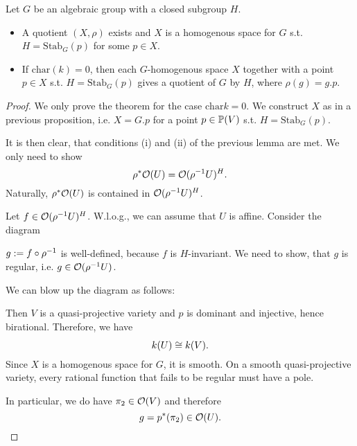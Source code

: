 \begin{theorem}
	Let $G$ be an algebraic group with a closed subgroup $H$.
	\begin{itemize}
		\item A quotient $(X, \rho)$ exists and $X$ is a homogenous space for $G$ s.t. $H = \mathrm{Stab}_G(p)$ for some $p \in X$.
		\item If $\mathrm{char}(k)= 0$, then each $G$-homogenous space $X$ together with a point $p\in X$ s.t. $H = \mathrm{Stab}_G(p)$ gives a quotient of $G$ by $H$, where $\rho(g) = g.p$.
	\end{itemize}
\end{theorem}
\begin{proof}
	We only prove the theorem for the case $\mathrm{char} k = 0$. We construct $X$ as in a previous proposition, i.e. $X = G.p$ for a point $p \in \P(V)$ s.t. $H = \mathrm{Stab}_G(p)$.
	
	It is then clear, that conditions (i) and (ii) of the previous lemma are met. We only need to show
	\[ \rho^*\O(U) = \O(\rho\i U)^H. \]
	Naturally, $\rho^*\O(U)$ is contained in $\O(\rho\i U)^H$.
	
	Let $f \in \O(\rho\i U)^H$. W.l.o.g., we can assume that $U$ is affine. Consider the diagram
	\begin{center}
	\end{center}
$g := f \circ \rho\i$ is well-defined, because $f$ is $H$-invariant. We need to show, that $g$ is regular, i.e. $g \in \O(\rho\i U)$.

We can blow up the diagram as follows:
	\begin{center}
\end{center}
Then $V$ is a quasi-projective variety and $p$ is dominant and injective, hence birational. Therefore, we have
\[ k(U) \isom{} k(V). \]
Since $X$ is a homogenous space for $G$, it is smooth. On a smooth quasi-projective variety, every rational function that fails to be regular must have a pole.

In particular, we do have $\pi_2 \in \O(V)$ and therefore
\[ g = p^*(\pi_2) \in \O(U). \]
\end{proof}


